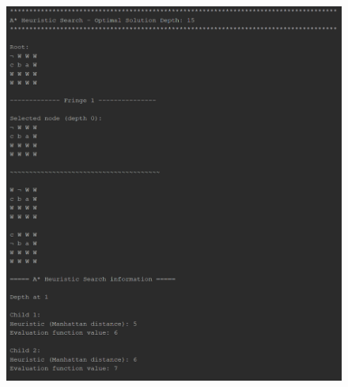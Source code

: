 \documentclass{article}
\begin{document}
	\begin{figure}[h]
		\centering
		\includegraphics[height=0.75\textheight]{AStar-2-1.png}
	\end{figure}
\end{document}
